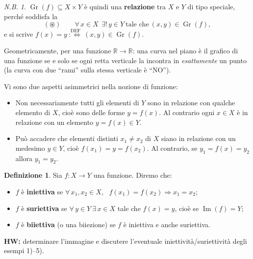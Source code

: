 \documentclass[11pt,a4paper]{article}
\newcommand{\R}{\mathbb{R}}
\newcommand{\im}{\operatorname{Im}}
\newcommand{\Gr}{\operatorname{Gr}}
\theoremstyle{definition}
\newtheorem{definizione}{Definizione}[section]
\theoremstyle{plain}
\theoremstyle{remark}
\newtheorem*{nb}{N.B.}
\begin{document}
\begin{nb}
$\Gr(f)\subseteq X\times Y$ \`e quindi una \textbf{relazione} tra $X$ e $Y$ di tipo speciale, perch\'e soddisfa la
\[
(\circledast)\qquad \forall\, x\in X\ \ \exists!\, y\in Y\ \text{tale che}\ (x,y)\in\Gr(f),
\]
e si scrive $f(x)=y\ \stackrel{\text{DEF}}{:\iff}\ (x,y)\in\Gr(f)$.

Geometricamente, per una funzione $\R\to\R$: una curva nel piano \`e il grafico di una funzione se e solo se ogni retta verticale la incontra in \emph{esattamente} un punto (la curva con due ``rami'' sulla stessa verticale \`e ``NO'').
\end{nb}

Vi sono due aspetti asimmetrici nella nozione di funzione:
\begin{itemize}
\item Non necessariamente tutti gli elementi di $Y$ sono in relazione con qualche elemento di $X$, cio\`e sono delle forme $y=f(x)$. Al contrario ogni $x\in X$ \`e in relazione con un elemento $y=f(x)\in Y$.
\item Pu\`o accadere che elementi distinti $x_1\neq x_2$ di $X$ siano in relazione con un medesimo $y\in Y$, cio\`e $f(x_1)=y=f(x_2)$. Al contrario, se $y_1=f(x)=y_2$ allora $y_1=y_2$.
\end{itemize}

\begin{definizione}
Sia $f\colon X\to Y$ una funzione. Diremo che:
\begin{itemize}
\item $f$ \`e \textbf{iniettiva} se $\forall\, x_1,x_2\in X$, \ $f(x_1)=f(x_2)\Rightarrow x_1=x_2$;
\item $f$ \`e \textbf{suriettiva} se $\forall\, y\in Y\ \exists\, x\in X$ tale che $f(x)=y$, cio\`e se $\im(f)=Y$;
\item $f$ \`e \textbf{biiettiva} (o una biiezione) se $f$ \`e iniettiva e anche suriettiva.
\end{itemize}
\end{definizione}

\textbf{HW:} determinare l'immagine e discutere l'eventuale iniettivit\`a/suriettivit\`a degli esempi 1)--5).
\end{document}
